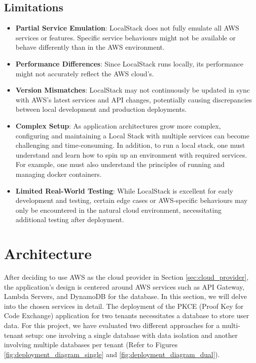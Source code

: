 \subsection{Limitations}
\begin{itemize}
    \item \textbf{Partial Service Emulation}: 
    LocalStack does not fully emulate all AWS services or features. Specific service behaviours might not be available or behave differently than in the AWS environment.
    
    \item \textbf{Performance Differences}: 
    Since LocalStack runs locally, its performance might not accurately reflect the AWS cloud's.
    
    
    \item \textbf{Version Mismatches}: 
    LocalStack may not continuously be updated in sync with AWS's latest services and API changes, potentially causing discrepancies between local development and production deployments.
    
    \item \textbf{Complex Setup}: 
    As application architectures grow more complex, configuring and maintaining a Local Stack with multiple services can become challenging and time-consuming. In addition, to run a local stack, one must understand and learn how to spin up an environment with required services. For example, one must also understand the principles of running and managing docker containers.
    
    \item \textbf{Limited Real-World Testing}: 
    While LocalStack is excellent for early development and testing, certain edge cases or AWS-specific behaviours may only be encountered in the natural cloud environment, necessitating additional testing after deployment.
    
\end{itemize}

\section{Architecture}
After deciding to use AWS as the cloud provider in Section \ref{sec:cloud_provider}, the application's design is centered around AWS services such as API Gateway, Lambda Servers, and DynamoDB for the database. In this section, we will delve into the chosen services in detail. The deployment of the PKCE (Proof Key for Code Exchange) application for two tenants necessitates a database to store user data. For this project, we have evaluated two different approaches for a multi-tenant setup: one involving a single database with data isolation and another involving multiple databases per tenant (Refer to Figures \ref{fig:deployment_diagram_single} and \ref{fig:deployment_diagram_dual}).

